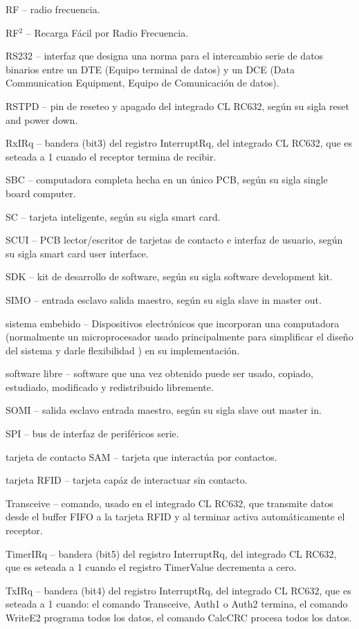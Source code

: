 \begin{glosario}
RF – radio frecuencia.

RF$^{2}$ – Recarga Fácil por Radio Frecuencia.

RS232 – interfaz que designa una norma para el intercambio serie de datos binarios entre un DTE (Equipo terminal de datos) y un DCE (Data Communication Equipment, Equipo de Comunicación de datos).

RSTPD – pin de reseteo y apagado del integrado CL RC632, según su sigla reset and power down.

RxIRq – bandera (bit3) del registro InterruptRq, del integrado CL RC632, que es seteada a 1 cuando el receptor termina de recibir.

SBC – computadora completa hecha en un único PCB, según su sigla single board computer.

SC – tarjeta inteligente, según su sigla smart card.

SCUI – PCB lector/escritor de tarjetas de contacto e interfaz de usuario, según su sigla smart card user interface.

SDK – kit de desarrollo de software, según su sigla software development kit.

SIMO – entrada esclavo salida maestro, según su sigla slave in master out.

sistema embebido – Dispositivos electrónicos que incorporan una computadora (normalmente un microprocesador usado principalmente para simplificar el diseño del sistema y darle flexibilidad ) en su implementación. 

software libre – software que una vez obtenido puede ser usado, copiado, estudiado, modificado y redistribuido libremente.

SOMI – salida esclavo entrada maestro, según su sigla slave out master in.

SPI – bus de interfaz de periféricos serie.

tarjeta de contacto SAM – tarjeta que interactúa por contactos.

tarjeta RFID – tarjeta capáz de interactuar sin contacto.

Transceive – comando, usado en el integrado CL RC632, que transmite datos desde el buffer FIFO a la tarjeta RFID y al terminar activa automáticamente el receptor.

TimerIRq – bandera (bit5) del registro InterruptRq, del integrado CL RC632, que es seteada a 1 cuando el registro TimerValue decrementa a cero.

TxIRq – bandera (bit4) del registro InterruptRq, del integrado CL RC632, que es seteada a 1 cuando: el comando Transceive, Auth1 o Auth2 termina, el comando WriteE2 programa todos los datos, el comando CalcCRC procesa todos los datos.


\end{glosario}
